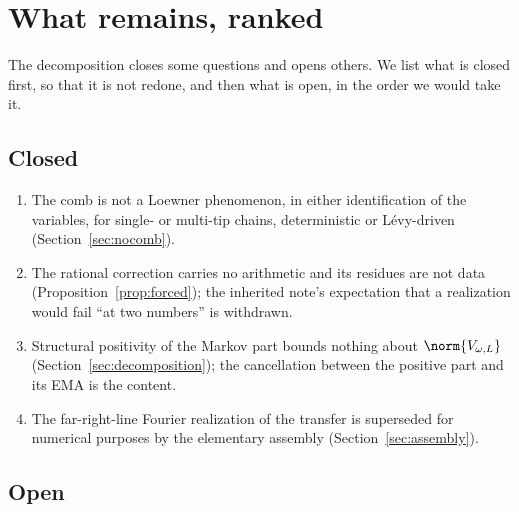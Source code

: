 \section{What remains, ranked}\label{sec:outlook}

The decomposition closes some questions and opens others. We list what is
closed first, so that it is not redone, and then what is open, in the order we
would take it.

\subsection{Closed}

\begin{enumerate}
\item The comb is not a Loewner phenomenon, in either identification of the
variables, for single- or multi-tip chains, deterministic or L\'evy-driven
(Section~\ref{sec:nocomb}).
\item The rational correction carries no arithmetic and its residues are not
data (Proposition~\ref{prop:forced}); the inherited note's expectation that a
realization would fail ``at two numbers'' is withdrawn.
\item Structural positivity of the Markov part bounds nothing about
$\norm{V_{\omega,L}}$ (Section~\ref{sec:decomposition}); the cancellation
between the positive part and its EMA is the content.
\item The far-right-line Fourier realization of the transfer is superseded for
numerical purposes by the elementary assembly (Section~\ref{sec:assembly}).
\end{enumerate}

\subsection{Open}

